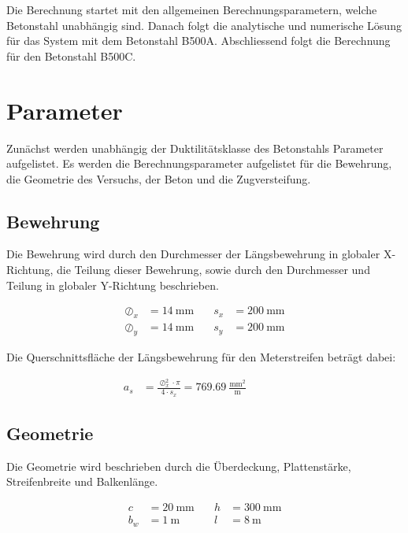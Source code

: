 \documentclass[
  11pt,
  letterpaper,
]{scrreprt}
\begin{document}
Die Berechnung startet mit den allgemeinen Berechnungsparametern, welche
Betonstahl unabhängig sind. Danach folgt die analytische und numerische
Lösung für das System mit dem Betonstahl B500A. Abschliessend folgt die
Berechnung für den Betonstahl B500C.

\section{Parameter}\label{parameter}

Zunächst werden unabhängig der Duktilitätsklasse des Betonstahls
Parameter aufgelistet. Es werden die Berechnungsparameter aufgelistet
für die Bewehrung, die Geometrie des Versuchs, der Beton und die
Zugversteifung.

\subsection{Bewehrung}\label{bewehrung}

Die Bewehrung wird durch den Durchmesser der Längsbewehrung in globaler
X-Richtung, die Teilung dieser Bewehrung, sowie durch den Durchmesser
und Teilung in globaler Y-Richtung beschrieben.

\[
\begin{aligned}
\oslash_{x}& = 14 \ \mathrm{mm} \quad & s_{x}& = 200 \ \mathrm{mm} \\ 
\oslash_{y}& = 14 \ \mathrm{mm} \quad & s_{y}& = 200 \ \mathrm{mm} \end{aligned}
\]

Die Querschnittsfläche der Längsbewehrung für den Meterstreifen beträgt
dabei:

\[
\begin{aligned}
a_{s}& = \frac{\oslash_{x}^{2} \cdot \pi}{4 \cdot s_{x}} = 769.69 \ \frac{\mathrm{mm}^{2}}{\mathrm{m}} \quad &  \quad &  
 \end{aligned}
\]

\subsection{Geometrie}\label{geometrie-1}

Die Geometrie wird beschrieben durch die Überdeckung, Plattenstärke,
Streifenbreite und Balkenlänge.

\[
\begin{aligned}
c& = 20 \ \mathrm{mm} \quad & h& = 300 \ \mathrm{mm} \\ 
b_{w}& = 1 \ \mathrm{m} \quad & l& = 8 \ \mathrm{m} \end{aligned}
\]
\end{document}

